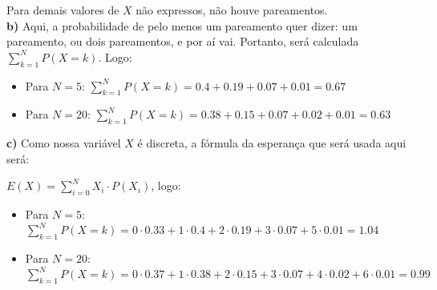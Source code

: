 \documentclass[12pt,letterpaper]{article}
\begin{document}
	Para demais valores de $X$ não expressos, não houve pareamentos. \\
	
	\textbf{b)} Aqui, a probabilidade de pelo menos um pareamento quer dizer: um pareamento, ou dois pareamentos, e por aí vai. Portanto, será calculada $\sum_{k=1}^{N} P(X=k)$. Logo:
	
	\begin{itemize}
		\item Para $N = 5$: $\sum_{k=1}^{N} P(X=k) = 0.4 + 0.19 + 0.07 + 0.01 = 0.67$
		\item Para $N = 20$: $\sum_{k=1}^{N} P(X=k) = 0.38 + 0.15 + 0.07 + 0.02 + 0.01 = 0.63$
	\end{itemize}
	
	\textbf{c)} Como nossa variável $X$ é discreta, a fórmula da esperança que será usada aqui será: 
	
	\begin{center}
		$E(X) = \sum_{i=0}^{N} X_i \cdot P(X_i)$, logo:
	\end{center}
	
	\begin{itemize}
		\item Para $N = 5$: $\sum_{k=1}^{N} P(X=k) = 0 \cdot 0.33 + 1 \cdot 0.4 + 2 \cdot 0.19 + 3 \cdot 0.07 + 5 \cdot 0.01 = 1.04$
		\item Para $N = 20$: $\sum_{k=1}^{N} P(X=k) = 0 \cdot 0.37 + 1 \cdot 0.38 + 2 \cdot 0.15 + 3 \cdot 0.07 + 4 \cdot 0.02 + 6 \cdot 0.01 = 0.99$
	\end{itemize}
	
\end{document}
